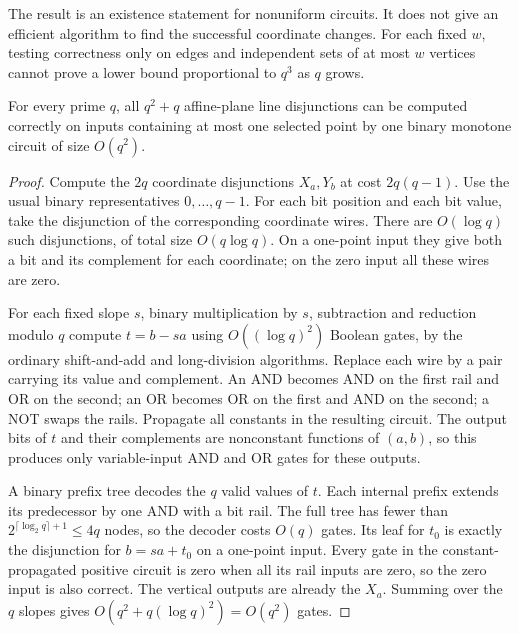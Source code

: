 The result is an existence statement for nonuniform circuits. It does not give an efficient algorithm to find the successful coordinate changes. For each fixed $w$, testing correctness only on edges and independent sets of at most $w$ vertices cannot prove a lower bound proportional to $q^3$ as $q$ grows.

\begin{proposition}\label{prop:lightlines}
For every prime $q$, all $q^2+q$ affine-plane line disjunctions can be computed correctly on inputs containing at most one selected point by one binary monotone circuit of size $O(q^2)$.
\end{proposition}
\begin{proof}
Compute the $2q$ coordinate disjunctions $X_a,Y_b$ at cost $2q(q-1)$. Use the usual binary representatives $0,\ldots,q-1$. For each bit position and each bit value, take the disjunction of the corresponding coordinate wires. There are $O(\log q)$ such disjunctions, of total size $O(q\log q)$. On a one-point input they give both a bit and its complement for each coordinate; on the zero input all these wires are zero.

For each fixed slope $s$, binary multiplication by $s$, subtraction and reduction modulo $q$ compute $t=b-sa$ using $O((\log q)^2)$ Boolean gates, by the ordinary shift-and-add and long-division algorithms. Replace each wire by a pair carrying its value and complement. An AND becomes AND on the first rail and OR on the second; an OR becomes OR on the first and AND on the second; a NOT swaps the rails. Propagate all constants in the resulting circuit. The output bits of $t$ and their complements are nonconstant functions of $(a,b)$, so this produces only variable-input AND and OR gates for these outputs.

A binary prefix tree decodes the $q$ valid values of $t$. Each internal prefix extends its predecessor by one AND with a bit rail. The full tree has fewer than $2^{\lceil\log_2q\rceil+1}\le4q$ nodes, so the decoder costs $O(q)$ gates. Its leaf for $t_0$ is exactly the disjunction for $b=sa+t_0$ on a one-point input. Every gate in the constant-propagated positive circuit is zero when all its rail inputs are zero, so the zero input is also correct. The vertical outputs are already the $X_a$. Summing over the $q$ slopes gives $O(q^2+q(\log q)^2)=O(q^2)$ gates.
\end{proof}
